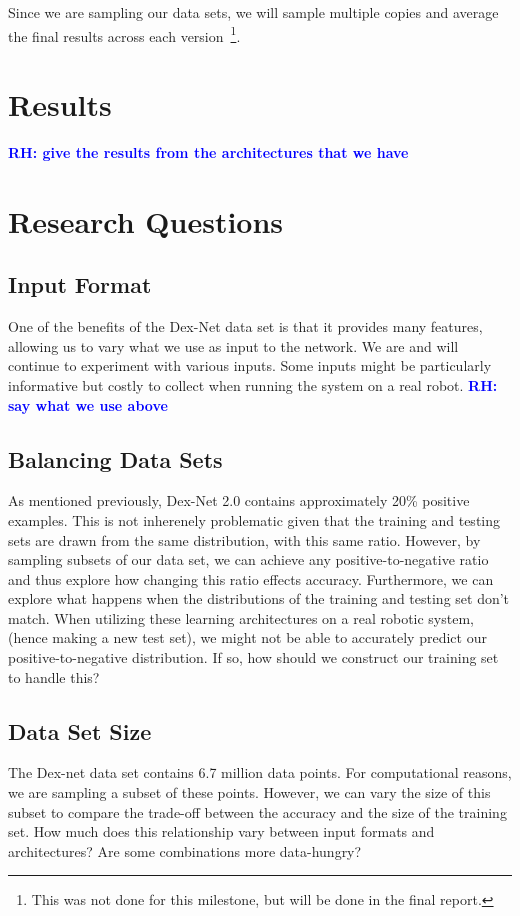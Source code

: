 \documentclass[letterpaper, 10 pt, conference]{../ieeeconf}
\newcommand{\rhnote}[1]{\ifthenelse{\boolean{include-notes}}%
 {\textcolor{blue}{\textbf{RH: #1}}}{}}
\begin{document}
Since we are sampling our data sets, we will sample multiple copies and average the final results across each version~\footnote{This was not done for this milestone, but will be done in the final report.}.

\section{Results}
\label{sec:results}
\rhnote{give the results from the architectures that we have}

\section{Research Questions}
\label{sec:questions}

\subsection{Input Format}
One of the benefits of the Dex-Net data set is that it provides many features, allowing us to vary what we use as input to the network. 
We are and will continue to experiment with various inputs. 
Some inputs might be particularly informative but costly to collect when running the system on a real robot. 
\rhnote{say what we use above}

\subsection{Balancing Data Sets}
As mentioned previously, Dex-Net 2.0 contains approximately 20\% positive examples. 
This is not inherenely problematic given that the training and testing sets are drawn from the same distribution, with this same ratio.
However, by sampling subsets of our data set, we can achieve any positive-to-negative ratio and thus explore how changing this ratio effects accuracy. 
Furthermore, we can explore what happens when the distributions of the training and testing set don't match. 
When utilizing these learning architectures on a real robotic system, (hence making a new test set), we might not be able to accurately predict our positive-to-negative distribution. 
If so, how should we construct our training set to handle this? 

\subsection{Data Set Size}
The Dex-net data set contains 6.7 million data points. 
For computational reasons, we are sampling a subset of these points. 
However, we can vary the size of this subset to compare the trade-off between the accuracy and the size of the training set. 
How much does this relationship vary between input formats and architectures? 
Are some combinations more data-hungry?
\end{document}
